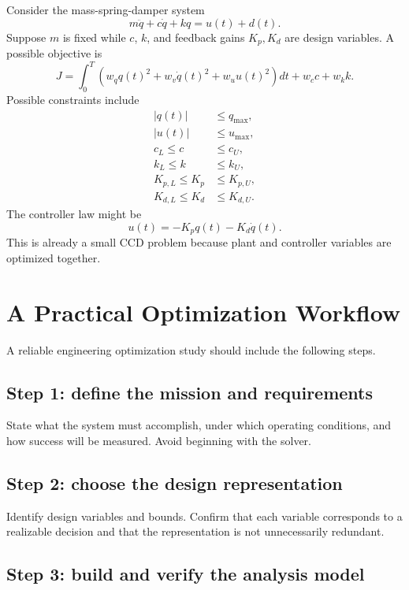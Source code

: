 \documentclass[11pt]{article}
\begin{document}
Consider the mass-spring-damper system
\begin{equation}
m\ddot{q}+c\dot{q}+kq=u(t)+d(t).
\end{equation}
Suppose $m$ is fixed while $c$, $k$, and feedback gains $K_p,K_d$ are design variables. A possible objective is
\begin{equation}
J=\int_0^{T}\left(w_q q(t)^2+w_v\dot{q}(t)^2+w_u u(t)^2\right)dt+w_c c+w_k k.
\end{equation}
Possible constraints include
\begin{align}
|q(t)| &\leq q_{\max}, \\
|u(t)| &\leq u_{\max}, \\
c_L \leq c &\leq c_U, \\
k_L \leq k &\leq k_U, \\
K_{p,L}\leq K_p &\leq K_{p,U}, \\
K_{d,L}\leq K_d &\leq K_{d,U}.
\end{align}
The controller law might be
\begin{equation}
u(t)=-K_pq(t)-K_d\dot{q}(t).
\end{equation}
This is already a small CCD problem because plant and controller variables are optimized together.

\section{A Practical Optimization Workflow}

A reliable engineering optimization study should include the following steps.

\subsection{Step 1: define the mission and requirements}

State what the system must accomplish, under which operating conditions, and how success will be measured. Avoid beginning with the solver.

\subsection{Step 2: choose the design representation}

Identify design variables and bounds. Confirm that each variable corresponds to a realizable decision and that the representation is not unnecessarily redundant.

\subsection{Step 3: build and verify the analysis model}
\end{document}
